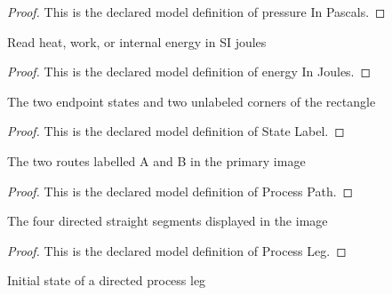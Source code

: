 \begin{proof}
  This is the declared model definition of pressure In Pascals.
\end{proof}
\begin{definition}
  \label{def:physics:phyx-mini-0408:phyxminiproblems-problemphyxmini0408-energyinjoules}
  Read heat, work, or internal energy in SI joules
\end{definition}
\begin{proof}
  This is the declared model definition of energy In Joules.
\end{proof}
\begin{definition}
  \label{def:physics:phyx-mini-0408:phyxminiproblems-problemphyxmini0408-statelabel}
  The two endpoint states and two unlabeled corners of the rectangle
\end{definition}
\begin{proof}
  This is the declared model definition of State Label.
\end{proof}
\begin{definition}
  \label{def:physics:phyx-mini-0408:phyxminiproblems-problemphyxmini0408-processpath}
  The two routes labelled A and B in the primary image
\end{definition}
\begin{proof}
  This is the declared model definition of Process Path.
\end{proof}
\begin{definition}
  \label{def:physics:phyx-mini-0408:phyxminiproblems-problemphyxmini0408-processleg}
  The four directed straight segments displayed in the image
\end{definition}
\begin{proof}
  This is the declared model definition of Process Leg.
\end{proof}
\begin{definition}
  \label{def:physics:phyx-mini-0408:phyxminiproblems-problemphyxmini0408-processleg-initialstate}
  Initial state of a directed process leg
\end{definition}
